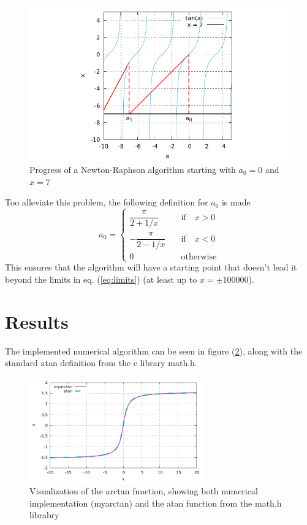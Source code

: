 \documentclass{article}
\begin{document}
\begin{figure}[h]
	\centering
	\includegraphics{tan.pdf}
	\caption{Progress of a Newton-Raphson algorithm starting with $a_0 = 0$ and $x = 7$}
	\label{fig:tan}
\end{figure}

Too alleviate this problem, the following definition for $a_0$ is made
\begin{equation}
	a_0 =
	\begin{cases}
		\dfrac{\pi}{2+1/x} \quad &\text{if} \quad x > 0 \\[10pt]
		-\dfrac{\pi}{2-1/x} \quad &\text{if} \quad x < 0 \\[10pt]
		0 \quad &\text{otherwise}
	\end{cases}
\end{equation}
This ensures that the algorithm will have a starting point that doesn't lead it beyond the limits in eq. (\ref{eq:limits}) (at least up to $x = \pm 100000$).

\section{Results}
The implemented numerical algorithm can be seen in figure (\ref{fig:atan}), along with the standard atan definition from the c library math.h.

\begin{figure}[h]
	\centering
	\includegraphics[width=0.67\textwidth]{atan.pdf}
	\caption{Visualization of the arctan function, showing both numerical implementation (myarctan) and the atan function from the math.h librabry}
	\label{fig:atan}
\end{figure}
\end{document}
